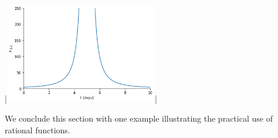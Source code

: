 \begin{example}
\begin{enumerate}
\begin{pyout}
|\includegraphics[width=0.5\textwidth]{fig_algebraic_10_Python.png}|
\end{pyout}
\fi
\end{enumerate}
\end{example}


\ifvc
We conclude this section with one example illustrating the practical use of rational functions. 





